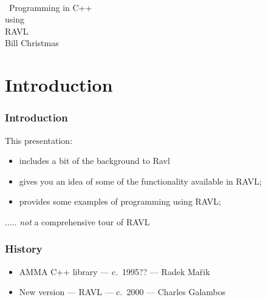 \documentclass[landscape]{beamer}
\begin{document}
\begin{frame}
  \pagecolor{titlebg} %
  \begin{center}
    \colorbox{titlebox}{\huge\parbox{0.75\textwidth}{ \textcolor{titlecolor}{ \centering ~\\~Programming in C++~\\ using\\[1ex] {\Huge RAVL}\\[1em]Bill Christmas\\[1ex]}}}
  \end{center}
\end{frame}

\section{Introduction}

\begin{frame}\frametitle{Introduction}

This presentation:

\begin{itemize}
\item includes a bit of the background to Ravl

\pause\item gives you an idea of some of the functionality available in RAVL;
  
\pause\item provides some examples of programming using RAVL;

\end{itemize}

\vfill\pause  ..... {\em not} a comprehensive tour of RAVL

\end{frame}

\begin{frame}  \frametitle{History}

  \begin{itemize}
  \item AMMA C++ library --- c.\ 1995?? --- Radek Ma\v{r}ik
\vfill\pause
  \item New version --- RAVL --- c.\ 2000 --- Charles Galambos
  \end{itemize}
  
\end{frame}
\end{document}
